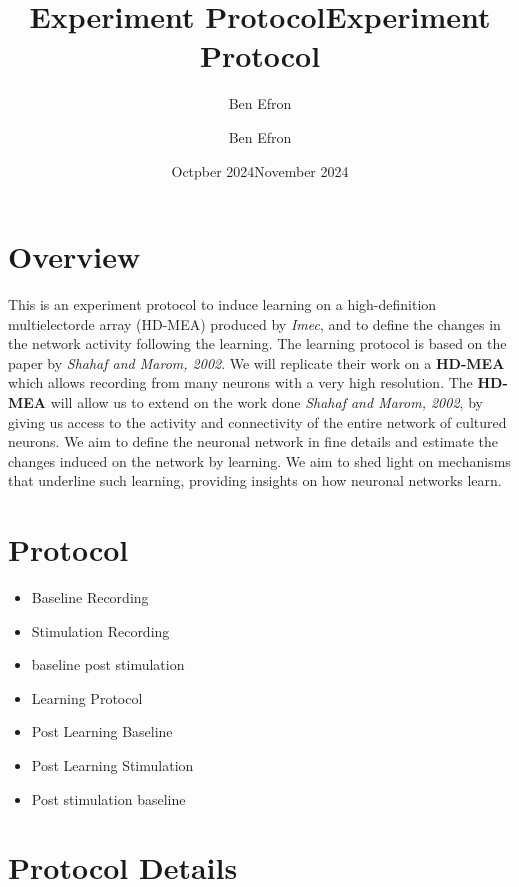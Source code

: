 \documentclass{article}
\title{Experiment Protocol}
\author{Ben Efron}
\date{Octpber 2024}
\begin{document}
\title{Experiment Protocol}
\author{Ben Efron}
\date{November 2024}

\maketitle

\section{Overview}
This is an experiment protocol to induce learning on a high-definition multielectorde array (HD-MEA) produced by \textit{Imec}, and to define the changes in the network activity following the learning. The learning protocol is based on the paper by \textit{Shahaf and Marom, 2002}. We will replicate their work on a \textbf{HD-MEA} which allows recording from many neurons with a very high resolution. The \textbf{HD-MEA} will allow us to extend on the work done \textit{Shahaf and Marom, 2002}, by giving us access to the activity and connectivity of the entire network of cultured neurons. We aim to define the neuronal network in fine details and estimate the changes induced on the network by learning. We aim to shed light on mechanisms that underline such learning, providing insights on how neuronal networks learn.

\section{Protocol}
\begin{itemize}
    \item Baseline Recording
    \item Stimulation Recording
    \item baseline post stimulation
    \item Learning Protocol
    \item Post Learning Baseline
    \item Post Learning Stimulation
    \item Post stimulation baseline
\end{itemize}

\section{Protocol Details}
\end{document}
